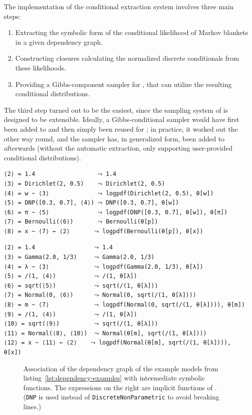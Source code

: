 The implementation of the conditional extraction system involves three main steps:
\begin{enumerate}
  \firmlist
\item Extracting the symbolic form of the conditional likelihood of Markov blankets in a given
  dependency graph.
\item Constructing closures calculating the normalized discrete conditionals from these likelihoods.
\item Providing a Gibbs-component sampler for \turingjl{}, that can utilize the resulting
  conditional distributions.
\end{enumerate}
The third step turned out to be the easiest, since the sampling system of \turingjl{} is designed to
be extensible.  Ideally, a Gibbs-conditional sampler would have first been added to \turingjl{} and
then simply been reused for \autogibbsjl{}; in practice, it worked out the other way round, and the
\autogibbsjl{} sampler has, in generalized form, been added to \turingjl{} afterwards (without the
automatic extraction, only supporting user-provided conditional distributions).

\newsavebox{\bmlikelihoods}
\begin{lrbox}{\bmlikelihoods}
\begin{lstlisting}[style=lstfloat]
⟨2⟩ = 1.4                  ⤳ 1.4
⟨3⟩ = Dirichlet(2, 0.5)    ⤳ Dirichlet(2, 0.5)
⟨4⟩ = w ~ ⟨3⟩              ⤳ logpdf(Dirichlet(2, 0.5), θ[w])
⟨5⟩ = DNP([0.3, 0.7], ⟨4⟩) ⤳ DNP([0.3, 0.7], θ[w])
⟨6⟩ = π ~ ⟨5⟩              ⤳ logpdf(DNP([0.3, 0.7], θ[w]), θ[π])
⟨7⟩ = Bernoulli(⟨6⟩)       ⤳ Bernoulli(θ[p])
⟨8⟩ = x ~ ⟨7⟩ ← ⟨2⟩       ⤳ logpdf(Bernoulli(θ[p]), θ[x])
\end{lstlisting}
\end{lrbox}
\newsavebox{\hglikelihoods}
\begin{lrbox}{\hglikelihoods}
\begin{lstlisting}[style=lstfloat]
⟨2⟩ = 1.4                 ⤳ 1.4
⟨3⟩ = Gamma(2.0, 1/3)     ⤳ Gamma(2.0, 1/3)
⟨4⟩ = λ ~ ⟨3⟩             ⤳ logpdf(Gamma(2.0, 1/3), θ[λ])
⟨5⟩ = /(1, ⟨4⟩)           ⤳ /(1, θ[λ])
⟨6⟩ = sqrt(⟨5⟩)           ⤳ sqrt(/(1, θ[λ]))
⟨7⟩ = Normal(0, ⟨6⟩)      ⤳ Normal(0, sqrt(/(1, θ[λ])))
⟨8⟩ = m ~ ⟨7⟩             ⤳ logpdf(Normal(0, sqrt(/(1, θ[λ]))), θ[m])
⟨9⟩ = /(1, ⟨4⟩)           ⤳ /(1, θ[λ])
⟨10⟩ = sqrt(⟨9⟩)          ⤳ sqrt(/(1, θ[λ]))
⟨11⟩ = Normal(⟨8⟩, ⟨10⟩)  ⤳ Normal(θ[m], sqrt(/(1, θ[λ])))
⟨12⟩ = x ~ ⟨11⟩ ← ⟨2⟩    ⤳ logpdf(Normal(θ[m], sqrt(/(1, θ[λ]))), θ[x])
\end{lstlisting}
\end{lrbox}
\begin{figure}[t]
  \loosesubcaptions
  \caption{Association of the dependency graph of the example models from
    listing~\ref{lst:dependency-examples} with intermediate symbolic functions.  The expressions on
    the right are implicit functions of \protect{}.  (\texttt{DNP} is used instead of
    \texttt{DiscreteNonParametric} to avoid breaking lines.)}
  \label{fig:continuations}
\end{figure}

